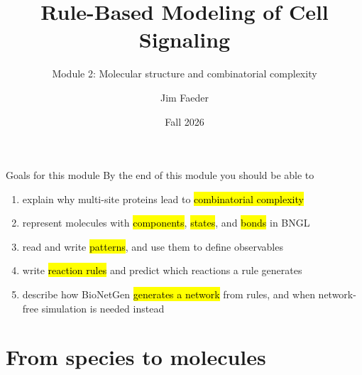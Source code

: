 \documentclass[aspectratio=169,10pt,t]{beamer}
\title{Rule-Based Modeling of Cell Signaling}
\subtitle{Module 2: Molecular structure and combinatorial complexity}
\author{Jim Faeder}
\institute{MSCBIO 2025 \textperiodcentered{} Introduction to Bioinformatics Programming in Python}
\date{Fall 2026}
\begin{document}
\begin{frame}[plain]
  \titlepage
\end{frame}


\newcommand{\bookchapters}{%
  \bookchapter{02-rules}{2}{Molecules, patterns, and rules}
  \bookchapter{04-rules-guide}{4}{A field guide to rules}
  \bookchapter{06-network-free}{6}{Network-free simulation}}


\begin{frame}{Goals for this module}
  By the end of this module you should be able to
  \begin{enumerate}[<+->]
    \setlength\itemsep{1.5mm}
    \item explain why multi-site proteins lead to \hl{combinatorial complexity}
    \item represent molecules with \hl{components}, \hl{states}, and \hl{bonds} in BNGL
    \item read and write \hl{patterns}, and use them to define observables
    \item write \hl{reaction rules} and predict which reactions a rule generates
    \item describe how BioNetGen \hl{generates a network} from rules, and when
          network-free simulation is needed instead
  \end{enumerate}
\end{frame}

\section{From species to molecules}
\end{document}
